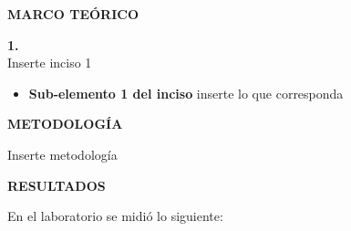 \documentclass[12pt]{article}
\begin{document}
	\newpage
	
	
	\begin{center}
		\textbf{\large MARCO TEÓRICO}\\
	\end{center}
	
	\textbf{1. }\\
	
	Inserte inciso 1
	
	\begin{itemize}
		\item \textbf{Sub-elemento 1 del inciso } inserte lo que corresponda
		
	\end{itemize}

	\newpage
	
	\begin{center}
		\textbf{\large METODOLOGÍA}\\
	\end{center}
	
	Inserte metodología
	
	\newpage
	
	\begin{center}
		\textbf{\large RESULTADOS}\\
	\end{center}
	
	\noindent En el laboratorio se midió lo siguiente:
	
\end{document}
